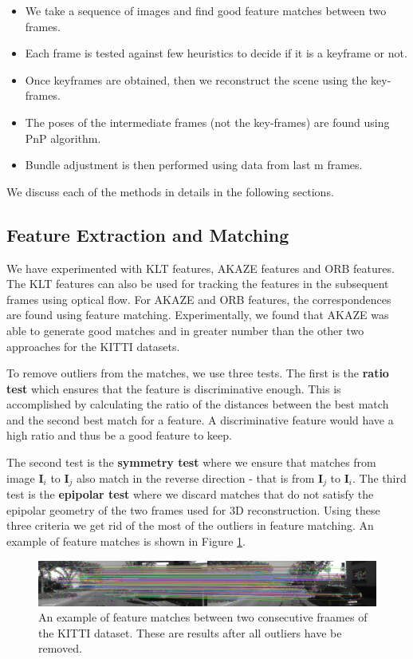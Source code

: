\documentclass{article}
\begin{document}
\begin{itemize}
\item We take a sequence of images and find good feature matches between two frames.
\item Each frame is tested against few heuristics to decide if it is a keyframe or not.
\item Once keyframes are obtained, then we reconstruct the scene using the key-frames.
\item The poses of the intermediate frames (not the key-frames) are found using PnP algorithm.
\item Bundle adjustment is then performed using data from last m frames.
\end{itemize}

We discuss each of the methods in details in the following sections.

\subsection{Feature Extraction and Matching}
We have experimented with KLT features, AKAZE features and ORB features. The KLT features can also be used for tracking the features in the subsequent frames using optical flow. For AKAZE\cite{akaze} and ORB features, the correspondences are found using feature matching. Experimentally, we found that AKAZE was able to generate good matches and in greater number than the other two approaches for the KITTI datasets\cite{kitti}.

To remove outliers from the matches, we use three tests. The first is the \textbf{ratio test} which ensures that the feature is discriminative enough. This is accomplished by calculating the ratio of the distances between the best match and the second best match for a feature. A discriminative feature would have a high ratio and thus be a good feature to keep.

The second test is the \textbf{symmetry test} where we ensure that matches from image $\textbf{I}_i$ to $\textbf{I}_j$ also match in the reverse direction - that is from $\textbf{I}_j$ to $\textbf{I}_i$. The third test is the \textbf{epipolar test} where we discard matches that do not satisfy the epipolar geometry of the two frames used for 3D reconstruction. Using these three criteria we get rid of the most of the outliers in feature matching. An example of feature matches is shown in Figure \ref{fig:matches}.

\begin{figure}
    \centering
    \includegraphics[width=\linewidth]{./matches.png}
    \caption{An example of feature matches between two consecutive fraames of the KITTI dataset. These are results after all outliers have be removed.}
    \label{fig:matches}
\end{figure}
\end{document}
